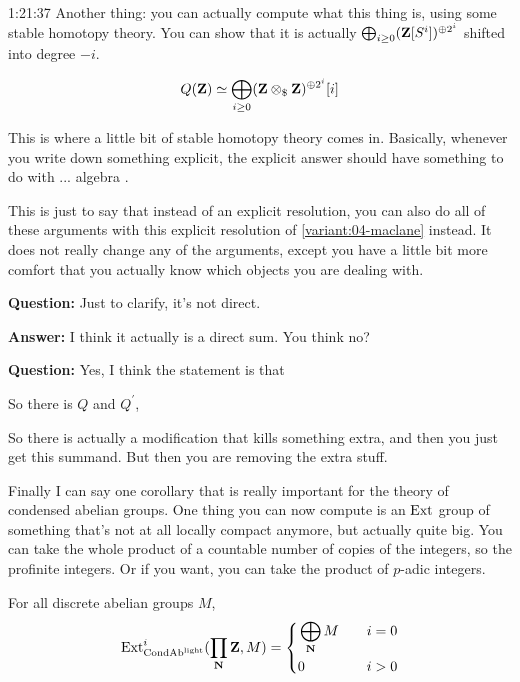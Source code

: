 \begin{unfinished}{1:21:37}
Another thing: you can actually compute what this thing is, using some stable homotopy theory. You can show that it is actually $\bigoplus_{i \geq 0} (\mathbf Z[S^i])^{\oplus 2^i}$ shifted into degree $-i$. 

\begin{align*}
	Q(\mathbf Z) \simeq \bigoplus_{i\geq0}(\mathbf Z \otimes_\$ \mathbf Z)^{\oplus2^{i}}[i]
\end{align*}

This is where a little bit of stable homotopy theory comes in. Basically, whenever you write down something explicit, the explicit answer should have something to do with ... algebra .

This is just to say that instead of an explicit resolution, you can also do all of these arguments with this explicit resolution of \ref{variant:04-maclane} instead. It does not really change any of the arguments, except you have a little bit more comfort that you actually know which objects you are dealing with.

\textbf{Question:} Just to clarify, it's not direct. 

\textbf{Answer:} I think it actually is a direct sum. You think no? 

\textbf{Question:} Yes, I think the statement is that 


So there is $Q$ and $Q^'$, 


So there is actually a modification that kills something extra, and then you just get this summand. But then you are removing the extra stuff.

Finally I can say one corollary that is really important for the theory of condensed abelian groups. One thing you can now compute is an $\operatorname{Ext}$ group of something that's not at all locally compact anymore, but actually quite big. You can take the whole product of a countable number of copies of the integers, so the profinite integers. Or if you want, you can take the product of $p$-adic integers.

\begin{corollary}
For all discrete abelian groups $M$, 
\begin{align*}
\operatorname{Ext}^i_{\mathrm{Cond}\mathrm{Ab}^{\mathrm{light}}}(\prod_\mathbf N \mathbf Z, M) =
\left\{
    \begin{aligned}
         & \bigoplus_\mathbf N M \quad & i = 0 \\
         & 0 \quad & i > 0 \\
    \end{aligned}
\right.
\end{align*}


\end{corollary}
\end{unfinished}
